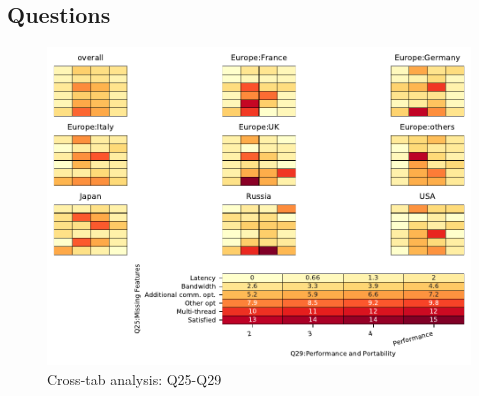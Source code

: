
\subsection{Questions}


\begin{figure}
\begin{center}
\includegraphics[width=12cm]{../pdfs/Q25-Q29.pdf}
\caption{Cross-tab analysis: Q25-Q29}
\label{fig:Q25-Q29}
\end{center}
\end{figure}
